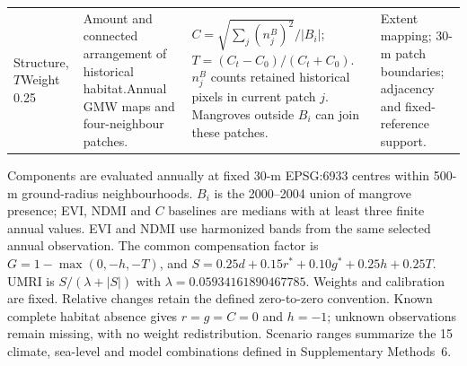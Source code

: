 \begin{longtable}{@{}>{\raggedright\arraybackslash}p{25mm}>{\raggedright\arraybackslash}p{42mm}>{\raggedright\arraybackslash}p{64mm}>{\raggedright\arraybackslash}p{29mm}@{}}
Structure, $T$\newline Weight 0.25 & Amount and connected arrangement of historical habitat.\newline Annual GMW maps and four-neighbour patches. & $C=\sqrt{\sum_j(n_j^B)^2}/|B_i|$;\newline $T=(C_t-C_0)/(C_t+C_0)$.\newline $n_j^B$ counts retained historical pixels in current patch $j$. Mangroves outside $B_i$ can join these patches. & Extent mapping; 30-m patch boundaries; adjacency and fixed-reference support.\\
\end{longtable}
{\small Components are evaluated annually at fixed 30-m EPSG:6933 centres within 500-m ground-radius neighbourhoods. $B_i$ is the 2000--2004 union of mangrove presence; EVI, NDMI and $C$ baselines are medians with at least three finite annual values. EVI and NDMI use harmonized bands from the same selected annual observation. The common compensation factor is $G=1-\max(0,-h,-T)$, and $S=0.25d+0.15r^\ast+0.10g^\ast+0.25h+0.25T$. UMRI is $S/(\lambda+|S|)$ with $\lambda=0.05934161890467785$. Weights and calibration are fixed. Relative changes retain the defined zero-to-zero convention. Known complete habitat absence gives $r=g=C=0$ and $h=-1$; unknown observations remain missing, with no weight redistribution. Scenario ranges summarize the 15 climate, sea-level and model combinations defined in Supplementary Methods~6.\par}
\endgroup

